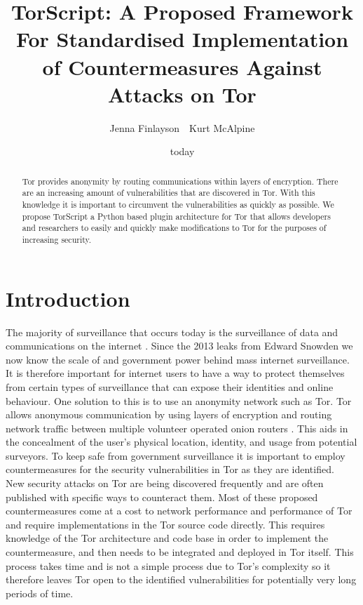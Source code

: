 \documentclass[9pt,technote]{IEEEtran}
\title{TorScript: A Proposed Framework For Standardised Implementation of Countermeasures Against Attacks on Tor}
\date{today}
\author{Jenna Finlayson~~Kurt McAlpine}
\begin{document}
 
\maketitle

\begin{abstract}
Tor provides anonymity by routing communications within layers of encryption.
There are an increasing amount of vulnerabilities that are discovered in Tor.
With this knowledge it is important to circumvent the vulnerabilities as quickly
as possible. We propose TorScript a Python based plugin architecture for Tor
that allows developers and researchers to easily and quickly make modifications
to Tor for the purposes of increasing security.
\end{abstract}

\section{Introduction} 
The majority of surveillance that occurs today is the surveillance of data and communications on the internet \cite{diffie2008brave}. Since the 2013 leaks from Edward Snowden we now know the scale of and government power behind mass internet surveillance. It is therefore important for internet users to have a way to protect themselves from certain types of surveillance that can expose their identities and online behaviour. One solution to this is to use an anonymity network such as Tor. Tor allows anonymous communication by using layers of encryption and routing network traffic between multiple volunteer operated onion routers \cite{tor}. This aids in the concealment of the
user's physical location, identity, and usage from potential surveyors. To keep
safe from government surveillance it is important to employ countermeasures for the security vulnerabilities in Tor as they are identified.\\

New security attacks on Tor are being discovered frequently and are often published with specific ways to counteract them. Most of these proposed countermeasures come at a cost to network performance and performance of Tor and require implementations in the Tor source code directly. This requires knowledge of the Tor architecture and code base in order to implement the countermeasure, and then needs to be integrated and deployed in Tor itself. This process takes time and is not a simple process due to Tor's complexity so it therefore leaves Tor open to the identified vulnerabilities for potentially very long periods of time. \\
\end{document}
